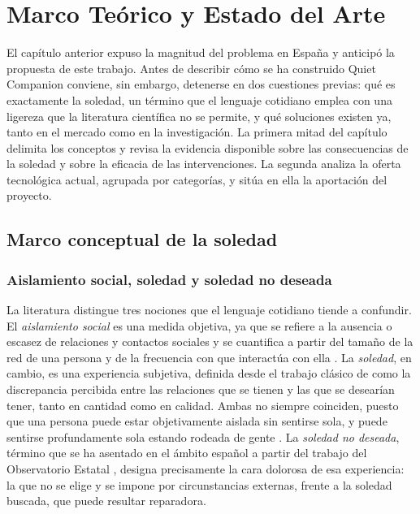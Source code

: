 \chapter{Marco Teórico y Estado del Arte}
\label{cap:marco-teorico}

El capítulo anterior expuso la magnitud del problema en España y anticipó la propuesta de este trabajo. Antes de describir cómo se ha construido Quiet Companion conviene, sin embargo, detenerse en dos cuestiones previas: qué es exactamente la soledad, un término que el lenguaje cotidiano emplea con una ligereza que la literatura científica no se permite, y qué soluciones existen ya, tanto en el mercado como en la investigación. La primera mitad del capítulo delimita los conceptos y revisa la evidencia disponible sobre las consecuencias de la soledad y sobre la eficacia de las intervenciones. La segunda analiza la oferta tecnológica actual, agrupada por categorías, y sitúa en ella la aportación del proyecto.

\section{Marco conceptual de la soledad}
\label{marco-conceptual}

\subsection{Aislamiento social, soledad y soledad no deseada}

La literatura distingue tres nociones que el lenguaje cotidiano tiende a confundir. El \textit{aislamiento social} es una medida objetiva, ya que se refiere a la ausencia o escasez de relaciones y contactos sociales y se cuantifica a partir del tamaño de la red de una persona y de la frecuencia con que interactúa con ella \citep{Courtin2017}. La \textit{soledad}, en cambio, es una experiencia subjetiva, definida desde el trabajo clásico de \textcite{Perlman1981} como la discrepancia percibida entre las relaciones que se tienen y las que se desearían tener, tanto en cantidad como en calidad. Ambas no siempre coinciden, puesto que una persona puede estar objetivamente aislada sin sentirse sola, y puede sentirse profundamente sola estando rodeada de gente \citep{Dykstra2009,Yanguas2018}. La \textit{soledad no deseada}, término que se ha asentado en el ámbito español a partir del trabajo del Observatorio Estatal \citep{SoledadES,JimenezRodriguez2024}, designa precisamente la cara dolorosa de esa experiencia: la que no se elige y se impone por circunstancias externas, frente a la soledad buscada, que puede resultar reparadora.

